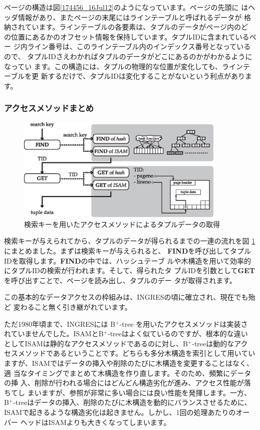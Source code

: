 ページの構造は図\ref{174456_16Jul12}のようになっています。ページの先頭に
はヘッダ情報があり、またページの末尾にはラインテーブルと呼ばれるデータが
格納されています。ラインテーブルの各要素は、タプルのデータがページ内のど
の位置にあるかのオフセット情報を保持しています。タプルIDに含まれているペー
ジ内ライン番号は、このラインテーブル内のインデックス番号となっているので、
タプルIDさえわかればタプルのデータがどこにあるのかがわかるようになってい
ます。この構造には、タプルの物理的な位置が変化しても、ラインテーブルを更
新するだけで、タプルIDは変化することがないという利点があります。


\subsubsection{アクセスメソッドまとめ}


\begin{figure}
 \begin{center}
  \includegraphics[width=100mm]{hayamiz/images/access-method.eps}
  \caption{検索キーを用いたアクセスメソッドによるタプルデータの取得}
  \label{190817_16Jul12}
 \end{center}
\end{figure}


検索キーが与えられてから、タプルのデータが得られるまでの一連の流れを図
\ref{190817_16Jul12}にまとめました。まずは検索キーが与えられると、{\bf
FIND}を呼び出してタプルIDを取得します。{\bf FIND}の中では、ハッシュテーブ
ルや木構造を用いて効率的にタプルIDの検索が行われます。そして、得られたタ
プルIDを引数として{\bf GET}を呼び出すことで、ページを読み出し、タプルのデー
タが取得されます。


この基本的なデータアクセスの枠組みは、INGRESの頃に確立され、現在でも殆ど
変わること無く引き継がれています。


ただ1980年頃まで、INGRESには B$^+$-tree を用いたアクセスメソッドは実装さ
れていませんでした。ISAMとB$^+$-treeはよく似ているのですが、根本的な違い
としてISAMは静的なアクセスメソッドであるのに対し、B$^+$-treeは動的なアク
セスメソッドであるということです。どちらも多分木構造を索引として用いてい
ますが、ISAMではデータの挿入や削除のたびに木構造を変更することはなく、適
当なタイミングでまとめて木構造を作り直します。そのため、頻繁にデータの挿
入、削除が行われる場合にはどんどん構造劣化が進み、アクセス性能が落ちてし
まいますが、参照が非常に多い場合には良い性能を発揮します。一方、
B$^+$-treeはデータの挿入、削除のたびに木構造を動的にバランスさせるために、
ISAMで起きるような構造劣化は起きません。しかし、1回の処理あたりのオーバー
ヘッドはISAMよりも大きくなってしまいます。


